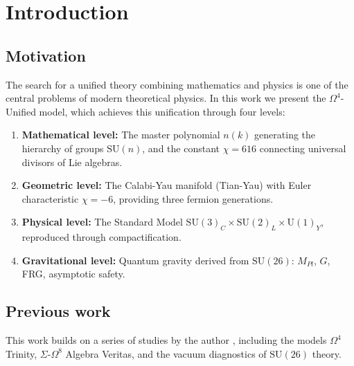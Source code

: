 \documentclass[12pt,a4paper,twoside]{article}
\newcommand{\SU}{\mathrm{SU}}
\newcommand{\Uone}{\mathrm{U}(1)}
\theoremstyle{definition}
\begin{document}
\newpage

\tableofcontents
\newpage

\section{Introduction}
\label{sec:intro}

\subsection{Motivation}

The search for a unified theory combining mathematics and physics is one of the central problems of modern theoretical physics. In this work we present the $\Omega^4$-Unified model, which achieves this unification through four levels:

\begin{enumerate}
    \item \textbf{Mathematical level:} The master polynomial $n(k)$ generating the hierarchy of groups $\SU(n)$, and the constant $\chi = 616$ connecting universal divisors of Lie algebras.
    
    \item \textbf{Geometric level:} The Calabi-Yau manifold (Tian-Yau) with Euler characteristic $\chi = -6$, providing three fermion generations.
    
    \item \textbf{Physical level:} The Standard Model $\SU(3)_C \times \SU(2)_L \times \Uone_Y$, reproduced through compactification.
    
    \item \textbf{Gravitational level:} Quantum gravity derived from $\SU(26)$: $M_{Pl}$, $G$, FRG, asymptotic safety.
\end{enumerate}

\subsection{Previous work}

This work builds on a series of studies by the author \cite{Matershov:2026a, Matershov:2026b, Matershov:2026c, Matershov:2026d, Matershov:2026e}, including the models $\Omega^4$ Trinity, $\Sigma$-$\Omega^8$ Algebra Veritas, and the vacuum diagnostics of $\SU(26)$ theory.
\end{document}
